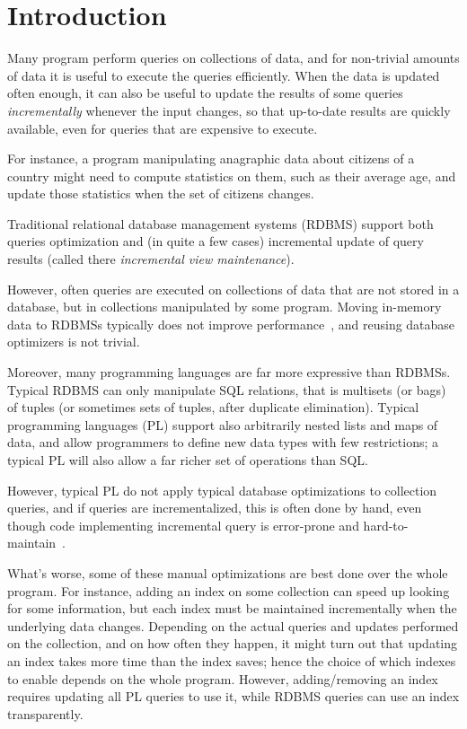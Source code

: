 \chapter{Introduction}

Many program perform queries on collections of data, and for non-trivial amounts
of data it is useful to execute the queries efficiently. When the data is
updated often enough, it can also be useful to update the results of some
queries \emph{incrementally} whenever the input changes, so that up-to-date
results are quickly available, even for queries that are expensive to execute.

For instance, a program manipulating anagraphic data about citizens of a country
might need to compute statistics on them, such as their average age, and update
those statistics when the set of citizens changes.

Traditional relational database management systems (RDBMS) support both queries
optimization and (in quite a few cases) incremental update of query results
(called there \emph{incremental view maintenance}).

However, often queries are executed on collections of data that are not stored
in a database, but in collections manipulated by some program. Moving in-memory
data to RDBMSs typically does not improve
performance~\citep{Stonebraker07,Rompf2015functional}, and reusing database
optimizers is not trivial.

Moreover, many programming languages are far more expressive than RDBMSs.
Typical RDBMS can only manipulate SQL relations, that is multisets (or bags) of
tuples (or sometimes sets of tuples, after duplicate elimination). Typical
programming languages (PL) support also arbitrarily nested lists and maps of
data, and allow programmers to define new data types with few restrictions; a
typical PL will also allow a far richer set of operations than SQL.

However, typical PL do not apply typical database optimizations to collection
queries, and if queries are incrementalized, this is often done by hand, even
though code implementing incremental query is error-prone and
hard-to-maintain~\citep{Salvaneschi13reactive}.

What's worse, some of these manual optimizations are best done over the whole
program. For instance, adding an index on some collection can speed up looking
for some information, but each index must be maintained incrementally when the
underlying data changes. Depending on the actual queries and updates performed
on the collection, and on how often they happen, it might turn out that updating
an index takes more time than the index saves; hence the choice of which indexes
to enable depends on the whole program. However, adding/removing an index
requires updating all PL queries to use it, while RDBMS queries can use an index
transparently.

